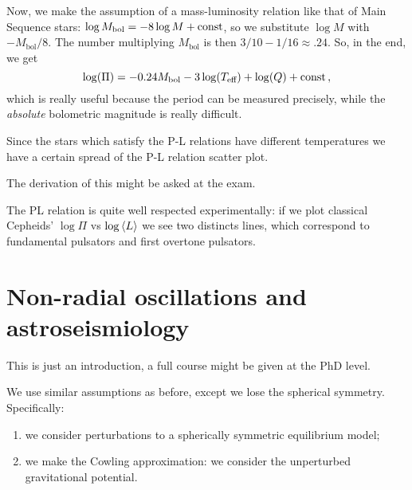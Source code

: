 \documentclass[main.tex]{subfiles}
\begin{document}
Now, we make the assumption of a mass-luminosity relation like that of Main Sequence stars: \(\log M _{\text{bol}} = - 8 \log M + \text{const}\), so we substitute \(\log M\) with \(- M _{\text{bol}} / 8\).
The number multiplying \(M _{\text{bol}}\) is then \(3/10 - 1/16 \approx \num{.24}\). So, in the end, we get
%
\begin{equation}
  \log(\Pi ) = \num{-0.24}M _{\text{bol}} - 3 \log(T _{\text{eff}}) + \log(Q) + \text{const}
\,,
\end{equation}
%
which is really useful because the period can be measured precisely, while the \emph{absolute} bolometric magnitude is really difficult.

Since the stars which satisfy the P-L relations have different temperatures we have a certain spread of the P-L relation scatter plot. 

The derivation of this might be asked at the exam.

The PL relation is quite well respected experimentally: if we plot classical Cepheids' \(\log \Pi \) vs \(\log \expval{L}\) we see two distincts lines, which correspond to fundamental pulsators and first overtone pulsators. 

\section{Non-radial oscillations and astroseismiology}

This is just an introduction, a full course might be given at the PhD level.

We use similar assumptions as before, except we lose the spherical symmetry. Specifically: 
\begin{enumerate}
  \item we consider perturbations to a spherically symmetric equilibrium model;
  \item we make the Cowling approximation: we consider the unperturbed gravitational potential.
\end{enumerate}
\end{document}
